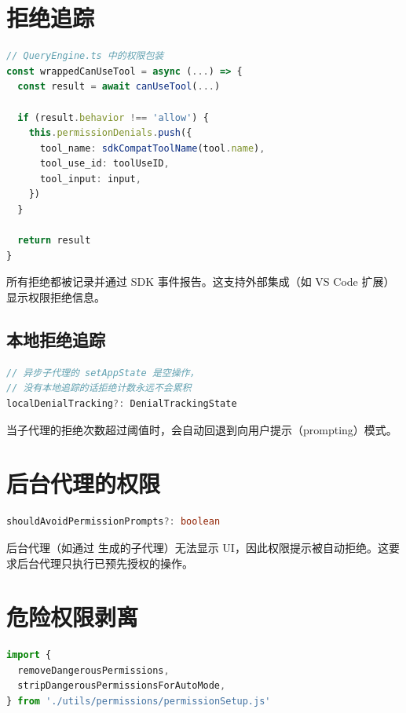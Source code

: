 \section{拒绝追踪}

\begin{lstlisting}[language=TypeScript,breaklines=true]
// QueryEngine.ts 中的权限包装
const wrappedCanUseTool = async (...) => {
  const result = await canUseTool(...)
  
  if (result.behavior !== 'allow') {
    this.permissionDenials.push({
      tool_name: sdkCompatToolName(tool.name),
      tool_use_id: toolUseID,
      tool_input: input,
    })
  }
  
  return result
}
\end{lstlisting}

所有拒绝都被记录并通过 SDK 事件报告。这支持外部集成（如 VS Code 扩展）显示权限拒绝信息。

\subsection{本地拒绝追踪}

\begin{lstlisting}[language=TypeScript,breaklines=true]
// 异步子代理的 setAppState 是空操作，
// 没有本地追踪的话拒绝计数永远不会累积
localDenialTracking?: DenialTrackingState
\end{lstlisting}

当子代理的拒绝次数超过阈值时，会自动回退到向用户提示（prompting）模式。

\section{后台代理的权限}

\begin{lstlisting}[language=TypeScript,breaklines=true]
shouldAvoidPermissionPrompts?: boolean
\end{lstlisting}

后台代理（如通过  生成的子代理）无法显示 UI，因此权限提示被自动拒绝。这要求后台代理只执行已预先授权的操作。

\section{危险权限剥离}

\begin{lstlisting}[language=TypeScript,breaklines=true]
import {
  removeDangerousPermissions,
  stripDangerousPermissionsForAutoMode,
} from './utils/permissions/permissionSetup.js'
\end{lstlisting}

